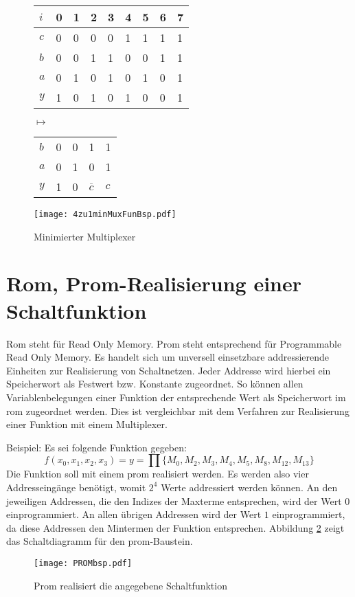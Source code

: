 \begin{figure}[htp]
	\centering
	\begin{tabular}{*{9}{l}}    
	$i$ & 0 & 1 & 2 & 3 & 4 & 5 & 6 & 7 \\ \hline
	$c$ & 0 & 0 & 0 & 0 & 1 & 1 & 1 & 1 \\
	$b$ & 0 & 0 & 1 & 1 & 0 & 0 & 1 & 1 \\
	$a$ & 0 & 1 & 0 & 1 & 0 & 1 & 0 & 1 \\ \hline
	$y$ & 1 & 0 & 1 & 0 & 1 & 0 & 0 & 1 \\
	\end{tabular}
	$\mapsto$
	\begin{tabular}{*{5}{l}}    
	$b$ & 0 & 0 & 1              & 1 \\
	$a$ & 0 & 1 & 0              & 1 \\ \hline
	$y$ & 1 & 0 & $\overline{c}$ & $c$ \\
	\end{tabular}
	
	\vspace{1cm}
	
	\texttt{[image: 4zu1minMuxFunBsp.pdf]}
	\caption{Minimierter Multiplexer}
	\label{minMuxFunBsp}
\end{figure}


\section{{\sc Rom, Prom}-Realisierung einer Schaltfunktion}
{\sc Rom} steht für Read Only Memory. {\sc Prom} steht entsprechend für Programmable Read Only Memory. Es handelt sich um unversell einsetzbare addressierende Einheiten zur Realisierung von Schaltnetzen. Jeder Addresse wird hierbei ein Speicherwort als Festwert bzw. Konstante zugeordnet. So können allen Variablenbelegungen einer Funktion der entsprechende Wert als Speicherwort im {\sc rom} zugeordnet werden. Dies ist vergleichbar mit dem Verfahren zur Realisierung einer Funktion mit einem Multiplexer.

Beispiel: Es sei folgende Funktion gegeben:
$$f(x_0, x_1, x_2, x_3) = y = \prod \{M_0, M_2, M_3, M_4, M_5, M_8, M_{12}, M_{13}\}$$ %
Die Funktion soll mit einem {\sc prom} realisiert werden. Es werden also vier Addresseingänge benötigt, womit $2^4$ Werte addressiert werden können. An den jeweiligen Addressen, die den Indizes der Maxterme entsprechen, wird der Wert $0$ einprogrammiert. An allen übrigen Addressen wird der Wert $1$ einprogrammiert, da diese Addressen den Mintermen der Funktion entsprechen. Abbildung \ref{PROMbeispiel} zeigt das Schaltdiagramm für den {\sc prom}-Baustein.
\begin{figure}[htp]
	\centering
	\texttt{[image: PROMbsp.pdf]}
	\caption{{\sc Prom} realisiert die angegebene Schaltfunktion}
	\label{PROMbeispiel}
\end{figure}

